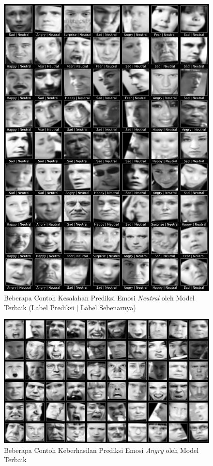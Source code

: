 \begin{figure}[t]
    \centering
    \includegraphics[width=14cm]{gambar/contoh_hasil_prediksi_false_neutral.png}
    \caption{Beberapa Contoh Kesalahan Prediksi Emosi \textit{Neutral} oleh Model Terbaik (Label Prediksi $|$ Label Sebenarnya)}
    \label{fig:hasilprediksifalse6}
\end{figure}

\begin{figure}[!t]
    \centering
    \includegraphics[width=14cm]{gambar/contoh_hasil_prediksi_true_angry.png}
    \caption{Beberapa Contoh Keberhasilan Prediksi Emosi \textit{Angry} oleh Model Terbaik}
    \label{fig:hasilprediksitrue1}
\end{figure}

